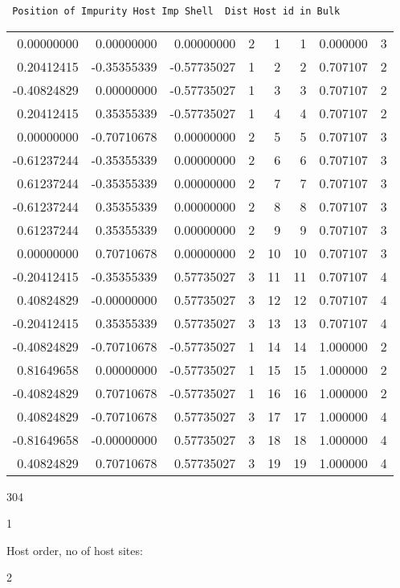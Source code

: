 {\small\tt
\hspace{0.5cm} Position of Impurity \hspace{1.9cm} Host Imp Shell \ Dist
\quad  Host id in Bulk

\noindent
\begin{tabular}{rrrrrrrr}
  0.00000000  &  0.00000000  & 0.00000000   & 2  & 1 &   1 & 0.000000  &  3 \\
  0.20412415  & -0.35355339  &-0.57735027   & 1  & 2 &   2 & 0.707107  &  2 \\
 -0.40824829  &  0.00000000  &-0.57735027   & 1  & 3 &   3 & 0.707107  &  2 \\
  0.20412415  &  0.35355339  &-0.57735027   & 1  & 4 &   4 & 0.707107  &  2 \\ 
  0.00000000  & -0.70710678  & 0.00000000   & 2  & 5 &   5 & 0.707107  &  3 \\
 -0.61237244  & -0.35355339  & 0.00000000   & 2  & 6 &   6 & 0.707107  &  3 \\
  0.61237244  & -0.35355339  & 0.00000000   & 2  & 7 &   7 & 0.707107  &  3 \\
 -0.61237244  &  0.35355339  & 0.00000000   & 2  & 8 &   8 & 0.707107  &  3 \\
  0.61237244  &  0.35355339  & 0.00000000   & 2  & 9 &   9 & 0.707107  &  3 \\
  0.00000000  &  0.70710678  & 0.00000000   & 2  & 10 & 10 & 0.707107  &  3 \\
 -0.20412415  & -0.35355339  & 0.57735027   & 3  & 11 & 11 & 0.707107  &  4 \\
  0.40824829  & -0.00000000  & 0.57735027   & 3  & 12 & 12 & 0.707107  &  4 \\
 -0.20412415  &  0.35355339  & 0.57735027   & 3  & 13 & 13 & 0.707107  &  4 \\
 -0.40824829  & -0.70710678  &-0.57735027   & 1  & 14 & 14 & 1.000000  &  2 \\
  0.81649658  &  0.00000000  &-0.57735027   & 1  & 15 & 15 & 1.000000  &  2 \\
 -0.40824829  &  0.70710678  &-0.57735027   & 1  & 16 & 16 & 1.000000  &  2 \\
  0.40824829  & -0.70710678  & 0.57735027   & 3  & 17 & 17 & 1.000000  &  4 \\
 -0.81649658  & -0.00000000  & 0.57735027   & 3  & 18 & 18 & 1.000000  &  4 \\
  0.40824829  &  0.70710678  & 0.57735027   & 3  & 19 & 19 & 1.000000  &  4 \\
\end{tabular}

304 

1

\noindent
Host order, no of host sites: 

2  
}
\bigskip

